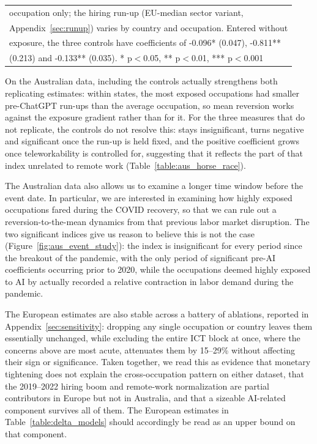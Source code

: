 \documentclass[11pt]{article}
\begin{document}
\begin{table}[htbp]
\begin{tabular}{lcccccc}
\multicolumn{7}{l}{\footnotesize occupation only; the hiring run-up (EU-median sector variant,} \\
\multicolumn{7}{l}{\footnotesize Appendix~\ref{sec:runup}) varies by country and occupation. Entered without} \\
\multicolumn{7}{l}{\footnotesize exposure, the three controls have coefficients of -0.096* (0.047), -0.811**} \\
\multicolumn{7}{l}{\footnotesize (0.213) and -0.133** (0.035). * p$<$0.05, ** p$<$0.01, *** p$<$0.001} \\
\end{tabular}
\label{table:horse_race}
\end{table}

On the Australian data, including the controls actually strengthens both replicating estimates: within states, the most exposed occupations had smaller pre-ChatGPT run-ups than the average occupation, so mean reversion works against the exposure gradient rather than for it. For the three measures that do not replicate, the controls do not resolve this: \citet{webb_impact_2022} stays insignificant, \citet{eloundou_gpts_2023} turns negative and significant once the run-up is held fixed, and the positive \citet{felten_method_2018} coefficient grows once teleworkability is controlled for, suggesting that it reflects the part of that index unrelated to remote work (Table~\ref{table:aus_horse_race}).

The Australian data also allows us to examine a longer time window before the event date. In particular, we are interested in examining how highly exposed occupations fared during the COVID recovery, so that we can rule out a reversion-to-the-mean dynamics from that previous labor market disruption. The two significant indices give us reason to believe this is not the case (Figure~\ref{fig:aus_event_study}): the \citet{handa2025economic} index is insignificant for every period since the breakout of the pandemic, with the only period of significant pre-AI coefficients occurring prior to 2020, while the occupations deemed highly exposed to AI by \citet{demirev2024assessing} actually recorded a relative contraction in labor demand during the pandemic.

The European estimates are also stable across a battery of ablations, reported in Appendix~\ref{sec:sensitivity}: dropping any single occupation or country leaves them essentially unchanged, while excluding the entire ICT block at once, where the concerns above are most acute, attenuates them by 15--29\% without affecting their sign or significance. Taken together, we read this as evidence that monetary tightening does not explain the cross-occupation pattern on either dataset, that the 2019--2022 hiring boom and remote-work normalization are partial contributors in Europe but not in Australia, and that a sizeable AI-related component survives all of them. The European estimates in Table~\ref{table:delta_models} should accordingly be read as an upper bound on that component.
\end{document}
